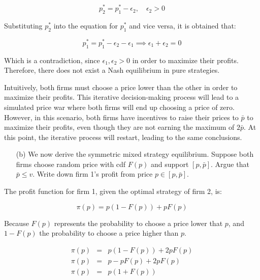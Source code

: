 \begin{equation*}
    p_2^* = p_1^* - \epsilon_2, \quad \epsilon_2 > 0
\end{equation*}

Substituting $p_2^*$ into the equation for $p_1^*$ and vice versa, it is obtained that:

\begin{equation*}
    p_1^* = p_1^* - \epsilon_2 - \epsilon_1 \implies \epsilon_1 + \epsilon_2 = 0
\end{equation*}

\begin{myanswerbox}
    Which is a contradiction, since $\epsilon_1, \epsilon_2 > 0$ in order to maximize their profits. Therefore, there does not exist a Nash equilibrium in pure strategies.

    Intuitively, both firms must choose a price lower than the other in order to maximize their profits. This iterative decision-making process will lead to a simulated price war where both firms will end up choosing a price of zero. However, in this scenario, both firms have incentives to raise their prices to $\bar{p}$ to maximize their profits, even though they are not earning the maximum of $2\bar{p}$. At this point, the iterative process will restart, leading to the same conclusions.
\end{myanswerbox}


\begin{tcolorbox}
    \begin{enumerate}
        \item[(b)] We now derive the symmetric mixed strategy equilibrium. Suppose both firms choose random price with cdf $F(p)$ and support $[p,\bar{p}]$. Argue that $\bar{p} \leq v$. Write down firm 1's profit from price $p \in [p,\bar{p}]$.
    \end{enumerate}
\end{tcolorbox}

The profit function for firm 1, given the optimal strategy of firm 2, is:

\begin{equation*}
    \pi(p) = p (1 - F(p)) + p F(p)
\end{equation*}

Because $F(p)$ represents the probability to choose a price lower that $p$, and $1 - F(p)$ the probability to choose a price higher than $p$.

\begin{eqnarray*}
    \pi(p) &=& p (1 - F(p)) + 2pF(p)\\
    \pi(p) &=& p - pF(p) + 2pF(p)\\
    \pi(p) &=& p (1 + F(p))
\end{eqnarray*}

